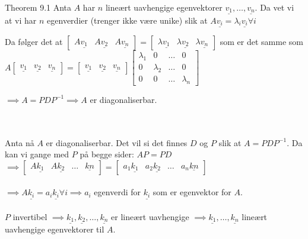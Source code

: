 \documentclass[11pt, a4paper, norsk]{article}
\begin{document}
        \begin{Proof}{Theorem 9.1}{}
            Anta $A$ har $n$ lineært uavhengige egenvektorer $\underline{v_1}, \dots ,\underline{v_{n}}$. Da vet vi at vi har $n$ egenverdier (trenger ikke være unike) slik at $A\underline{v_{i}} = \lambda_{i}\underline{v_{i}} \forall i$

            Da følger det at $\begin{bmatrix}
                A\underline{v_1} & A\underline{v_2} & A\underline{v_{n}}
            \end{bmatrix} = \begin{bmatrix}
                \lambda\underline{v_1} & \lambda\underline{v_2} & \lambda\underline{v_{n}}
            \end{bmatrix}$ som er det samme som $A\begin{bmatrix}
                \underline{v_1} & \underline{v_2} & \underline{v_{n}}\end{bmatrix} = \begin{bmatrix}
                    \underline{v_1} & \underline{v_2} & \underline{v_{n}}
                \end{bmatrix}\begin{bmatrix}
                    \lambda_1 & 0 & \dots & 0 \\
                    0 & \lambda_2 & \dots & 0 \\
                    0 & 0 & \dots & \lambda_{n}
                \end{bmatrix}$

                $\implies A = PDP^{-1} \implies A$ er diagonaliserbar.

                \\
                \\
                Anta nå $A$ er diagonaliserbar. Det vil si det finnes $D$ og $P$ slik at $A = PDP^{-1}$. Da kan vi gange med $P$ på begge sider: $AP = PD$
                \\
                $\implies \begin{bmatrix}
                    A\underline{k_1} & A\underline{k_2} & \dots & \underline{kn}
                \end{bmatrix} = \begin{bmatrix}
                    a_1\underline{k_1} & a_2\underline{k_2} & \dots & a_{n}\underline{kn}
                \end{bmatrix}$
                \\
                \\
                $\implies A\underline{k_{i}} = a_{i}\underline{k_{i}} \forall i \implies a_{i}$ egenverdi for $\underline{k_{i}}$ som er egenvektor for $A$. 
                \\
                \\
                $P$ invertibel $\implies \underline{k_1}, \underline{k_2}, \dots ,\underline{k_{n}}$ er lineært uavhengige $\implies \underline{k_1}, \dots ,\underline{k_{n}}$ lineært uavhengige egenvektorer til $A$. 
        \end{Proof}
\end{document}
